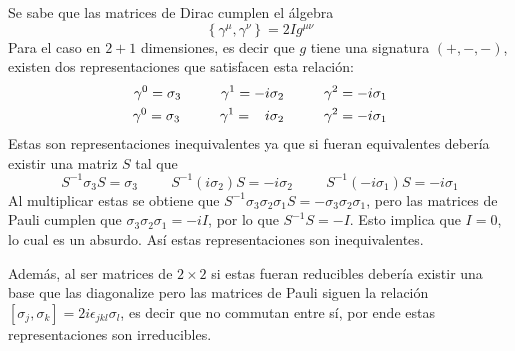 Se sabe que las matrices de Dirac cumplen el álgebra
\begin{equation}
	\left\{\gamma^\mu,\gamma^\nu\right\} = 2I g^{\mu\nu}\label{eq:clifford}
\end{equation}
Para el caso en $2+1$ dimensiones, es decir que $g$ tiene una signatura $(+, -, -)$, existen dos representaciones que satisfacen esta relación:
\begin{align}
	\begin{split}
		\gamma^{0} = \sigma_3 \hspace{1cm} \gamma^{1} = -i\sigma_2\hspace{1cm} \gamma^{2} = -i\sigma_1\\
		\gamma^{0} = \sigma_3 \hspace{1cm} \gamma^{1} = \hspace{0.3cm}i\sigma_2 \hspace{1cm} \gamma^{2} = -i\sigma_1
	\end{split}\label{eq:DiracMatrices}
\end{align}
Estas son representaciones inequivalentes ya que si fueran equivalentes debería existir una matriz $S$ tal que
\begin{equation}
	S^{-1}\sigma_3 S = \sigma_3 \hspace{1cm} S^{-1}(i\sigma_2) S = -i\sigma_2 \hspace{1cm} S^{-1}(-i\sigma_1)S = -i\sigma_1
\end{equation}
Al multiplicar estas se obtiene que $S^{-1} \sigma_3\sigma_2\sigma_1 S = -\sigma_3\sigma_2\sigma_1$, pero las matrices de Pauli cumplen que $\sigma_3\sigma_2\sigma_1 = -iI$, por lo que $S^{-1} S = -I$. Esto implica que $I = 0$, lo cual es un absurdo. Así estas representaciones son inequivalentes.\par
Además, al ser matrices de $2\times 2$ si estas fueran reducibles debería existir una base que las diagonalize pero las matrices de Pauli siguen la relación $\left[\sigma_j,\sigma_k\right]= 2i\epsilon_{jkl}\sigma_{l}$, es decir que no commutan entre sí, por ende estas representaciones son irreducibles.

